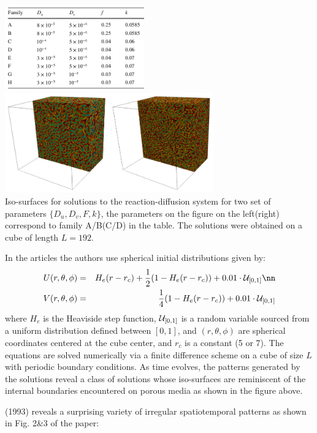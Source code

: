 \begin{center}
\includegraphics[width=6cm]{python_codes/fieldstone_171/images/gama01}
\includegraphics[width=9cm]{python_codes/fieldstone_171/images/gama02}\\
{\captionfont Iso-surfaces for solutions to the reaction-diffusion system 
for two set of parameters $\{D_u,D_v,F,k\}$, the parameters on the figure on 
the left(right) correspond to family A/B(C/D) in the table. The solutions were
obtained on a cube of length $L=192$.}
\end{center}

In the articles the authors use spherical initial distributions given by:
\begin{eqnarray}
U(r,\theta,\phi) &=& H_e(r-r_c) +\frac12 (1-H_e(r-r_c)) + 0.01 \cdot {\cal U}_{[0,1]} \nn\\
V(r,\theta,\phi) &=& \frac14 (1-H_e(r-r_c)) + 0.01 \cdot {\cal U}_{[0,1]}
\end{eqnarray}
where $H_e$ is the Heaviside step function, ${\cal U}_{[0,1]}$ is a random variable sourced from a 
uniform distribution defined between $[0,1]$, and $(r,\theta,\phi)$ are spherical coordinates centered at
the cube center, and $r_c$ is a constant (5 or 7).
The equations are solved numerically via a finite difference scheme on a cube of size $L$
with periodic boundary conditions. As time evolves, the patterns generated by
the solutions reveal a class of solutions whose iso-surfaces are reminiscent of the internal
boundaries encountered on porous media as shown in the figure above.



\textcite{pear93} (1993) reveals a surprising variety of irregular spatiotemporal patterns
as shown in Fig. 2\&3 of the paper:


